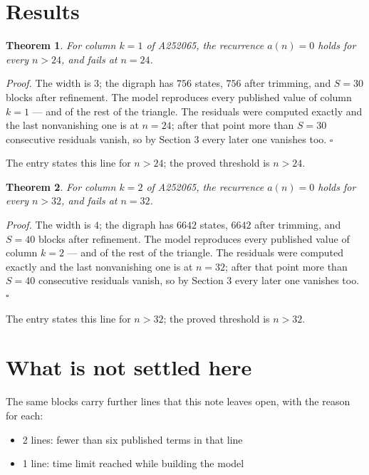 \documentclass[11pt]{article}
\newtheorem{theorem}{Theorem}
\theoremstyle{definition}
\begin{document}
\section{Results}

\begin{theorem} For column $k = 1$ of A252065, the recurrence $a(n) = 0$ holds for every $n > 24$, and fails at $n = 24$.\end{theorem}

{\itshape Proof.} The width is $3$; the digraph has $756$ states, $756$ after trimming, and $S = 30$ blocks after refinement. The model reproduces every published value of column $k = 1$ --- and of the rest of the triangle. The residuals were computed exactly and the last nonvanishing one is at $n = 24$; after that point more than $S = 30$ consecutive residuals vanish, so by Section 3 every later one vanishes too. $\square$

The entry states this line for $n > 24$; the proved threshold is $n > 24$.

\begin{theorem} For column $k = 2$ of A252065, the recurrence $a(n) = 0$ holds for every $n > 32$, and fails at $n = 32$.\end{theorem}

{\itshape Proof.} The width is $4$; the digraph has $6642$ states, $6642$ after trimming, and $S = 40$ blocks after refinement. The model reproduces every published value of column $k = 2$ --- and of the rest of the triangle. The residuals were computed exactly and the last nonvanishing one is at $n = 32$; after that point more than $S = 40$ consecutive residuals vanish, so by Section 3 every later one vanishes too. $\square$

The entry states this line for $n > 32$; the proved threshold is $n > 32$.

\section{What is not settled here}

The same blocks carry further lines that this note leaves open, with the reason for each:

\begin{itemize}

\item 2 lines: fewer than six published terms in that line

\item 1 line: time limit reached while building the model

\end{itemize}
\end{document}

